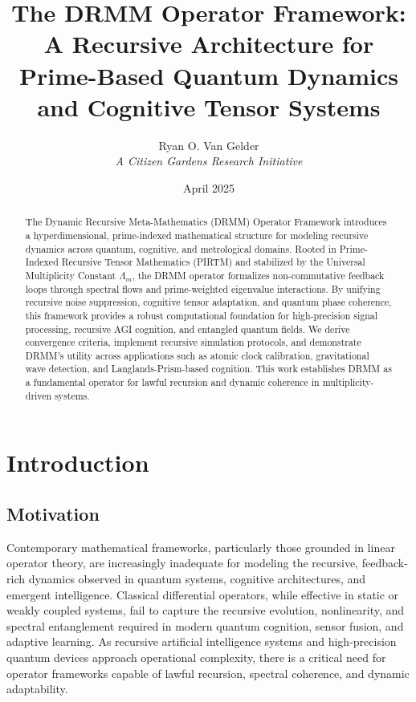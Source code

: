 \documentclass{article}
\theoremstyle{plain}
\begin{document}
\title{The DRMM Operator Framework:\\ \large A Recursive Architecture for Prime-Based Quantum Dynamics \\ and Cognitive Tensor Systems}

\author{Ryan O. Van Gelder \\ \textit{A Citizen Gardens Research Initiative}}
\date{April 2025}

\maketitle
\nolinenumbers
\begin{abstract}
The Dynamic Recursive Meta-Mathematics (DRMM) Operator Framework introduces a hyperdimensional, prime-indexed mathematical structure for modeling recursive dynamics across quantum, cognitive, and metrological domains. Rooted in Prime-Indexed Recursive Tensor Mathematics (PIRTM) and stabilized by the Universal Multiplicity Constant $\Lambda_m$, the DRMM operator formalizes non-commutative feedback loops through spectral flows and prime-weighted eigenvalue interactions. By unifying recursive noise suppression, cognitive tensor adaptation, and quantum phase coherence, this framework provides a robust computational foundation for high-precision signal processing, recursive AGI cognition, and entangled quantum fields. We derive convergence criteria, implement recursive simulation protocols, and demonstrate DRMM's utility across applications such as atomic clock calibration, gravitational wave detection, and Langlands-Prism-based cognition. This work establishes DRMM as a fundamental operator for lawful recursion and dynamic coherence in multiplicity-driven systems.
\end{abstract}

\section{Introduction}

\subsection{Motivation}

Contemporary mathematical frameworks, particularly those grounded in linear operator theory, are increasingly inadequate for modeling the recursive, feedback-rich dynamics observed in quantum systems, cognitive architectures, and emergent intelligence. Classical differential operators, while effective in static or weakly coupled systems, fail to capture the recursive evolution, nonlinearity, and spectral entanglement required in modern quantum cognition, sensor fusion, and adaptive learning. As recursive artificial intelligence systems and high-precision quantum devices approach operational complexity, there is a critical need for operator frameworks capable of lawful recursion, spectral coherence, and dynamic adaptability.
\end{document}
